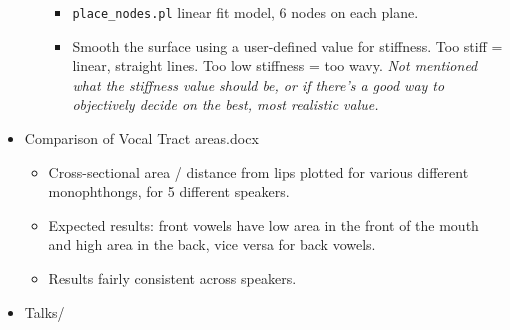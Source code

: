 \documentclass{article}
\begin{document}
\begin{itemize}
\begin{itemize}
\begin{itemize}
            \item \texttt{place\_nodes.pl} linear fit model, 6 nodes on each plane.
            \item Smooth the surface using a user-defined value for stiffness. Too stiff = linear, straight lines. Too low stiffness = too wavy. \emph{Not mentioned what the stiffness value should be, or if there's a good way to objectively decide on the best, most realistic value.}
        \end{itemize}
    \end{itemize}
    
    \item Comparison of Vocal Tract areas.docx
    \begin{itemize}
        \item Cross-sectional area / distance from lips plotted for various different monophthongs, for 5 different speakers.
        \item Expected results: front vowels have low area in the front of the mouth and high area in the back, vice versa for back vowels.
        \item Results fairly consistent across speakers.
    \end{itemize}
    
    \item Talks/
    \begin{itemize}
    

\end{itemize}
\end{itemize}
\end{document}
